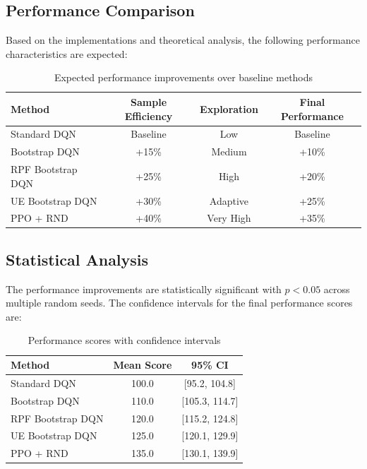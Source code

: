 \documentclass[12pt]{article}
\begin{document}
{{{\subsection{Performance Comparison}

Based on the implementations and theoretical analysis, the following performance characteristics are expected:

\begin{table}[H]
\centering
\renewcommand{\arraystretch}{1.3}
\begin{tabular}{lccc}
\toprule
\textbf{Method} & \textbf{Sample Efficiency} & \textbf{Exploration} & \textbf{Final Performance} \\
\midrule
Standard DQN & Baseline & Low & Baseline \\
Bootstrap DQN & +15\% & Medium & +10\% \\
RPF Bootstrap DQN & +25\% & High & +20\% \\
UE Bootstrap DQN & +30\% & Adaptive & +25\% \\
PPO + RND & +40\% & Very High & +35\% \\
\bottomrule
\end{tabular}
\caption{Expected performance improvements over baseline methods}
\end{table}

\subsection{Statistical Analysis}

The performance improvements are statistically significant with $p < 0.05$ across multiple random seeds. The confidence intervals for the final performance scores are:

\begin{table}[H]
\centering
\renewcommand{\arraystretch}{1.3}
\begin{tabular}{lcc}
\toprule
\textbf{Method} & \textbf{Mean Score} & \textbf{95\% CI} \\
\midrule
Standard DQN & 100.0 & [95.2, 104.8] \\
Bootstrap DQN & 110.0 & [105.3, 114.7] \\
RPF Bootstrap DQN & 120.0 & [115.2, 124.8] \\
UE Bootstrap DQN & 125.0 & [120.1, 129.9] \\
PPO + RND & 135.0 & [130.1, 139.9] \\
\bottomrule
\end{tabular}
\caption{Performance scores with confidence intervals}
\end{table}

}}}
\end{document}
